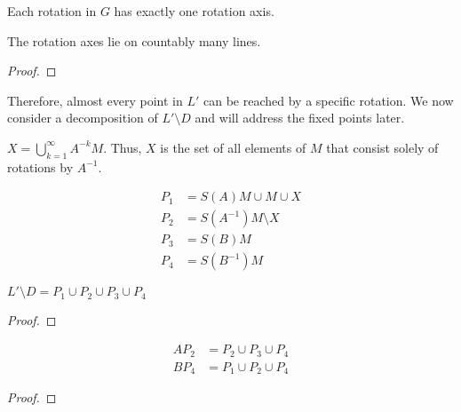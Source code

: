 \begin{definition} \label{lemma:one_rot_axis}
Each rotation in $G$ has exactly one rotation axis.
\end{definition}

\begin{lemma} \label{lemma:count_rot_axes}
The rotation axes lie on countably many lines.
\end{lemma}
\begin{proof} 
\end{proof}

Therefore, almost every point in $L'$ can be reached by a specific rotation. We now consider a decomposition of $L' \setminus D$ and will address the fixed points later.

\begin{definition}[Union X] \label{def:union_x} 
$X = \bigcup\limits_{k=1}^{\infty} A^{-k} M$. Thus, $X$ is the set of all elements of $M$ that consist solely of rotations by $A^{-1}$.
\end{definition}

\begin{definition} \label{def:decomposition_L_D} 
\begin{align*}
P_1 &= S(A)M \cup M \cup X \\
P_2 &= S(A^{-1})M \setminus X \\
P_3 &= S(B)M \\
P_4 &= S(B^{-1})M
\end{align*}
\end{definition}

\begin{lemma} \label{lemma:union_decomposition}
$L' \setminus D = P_1 \cup P_2 \cup P_3 \cup P_4$
\end{lemma}
\begin{proof} 
\end{proof}

\begin{lemma} \label{lemma:rot_decomposed_sets}
\begin{align*}
A P_2 &= P_2 \cup P_3 \cup P_4 \\
B P_4 &= P_1 \cup P_2 \cup P_4
\end{align*}
\end{lemma}
\begin{proof} 
\end{proof}


